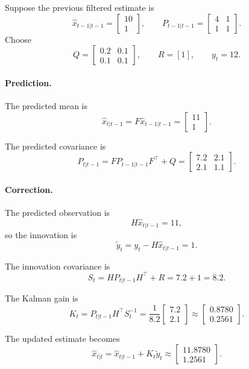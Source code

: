 \documentclass[12pt,a4paper]{article}
\begin{document}
Suppose the previous filtered estimate is
\[
\hat{x}_{t-1|t-1} =
\begin{bmatrix}
10\\
1
\end{bmatrix},
\qquad
P_{t-1|t-1} =
\begin{bmatrix}
4 & 1\\
1 & 1
\end{bmatrix}.
\]
Choose
\[
Q =
\begin{bmatrix}
0.2 & 0.1\\
0.1 & 0.1
\end{bmatrix},
\qquad
R = [1],
\qquad
y_t = 12.
\]

\paragraph{Prediction.}
The predicted mean is
\[
\hat{x}_{t|t-1}
=
F\hat{x}_{t-1|t-1}
=
\begin{bmatrix}
11\\
1
\end{bmatrix}.
\]

The predicted covariance is
\[
P_{t|t-1}
=
F P_{t-1|t-1} F^\top + Q
=
\begin{bmatrix}
7.2 & 2.1\\
2.1 & 1.1
\end{bmatrix}.
\]

\paragraph{Correction.}
The predicted observation is
\[
H\hat{x}_{t|t-1} = 11,
\]
so the innovation is
\[
\tilde{y}_t = y_t - H\hat{x}_{t|t-1} = 1.
\]

The innovation covariance is
\[
S_t = H P_{t|t-1} H^\top + R = 7.2 + 1 = 8.2.
\]

The Kalman gain is
\[
K_t
=
P_{t|t-1} H^\top S_t^{-1}
=
\frac{1}{8.2}
\begin{bmatrix}
7.2\\
2.1
\end{bmatrix}
\approx
\begin{bmatrix}
0.8780\\
0.2561
\end{bmatrix}.
\]

The updated estimate becomes
\[
\hat{x}_{t|t}
=
\hat{x}_{t|t-1} + K_t \tilde{y}_t
\approx
\begin{bmatrix}
11.8780\\
1.2561
\end{bmatrix}.
\]
\end{document}
